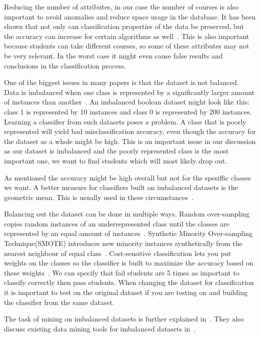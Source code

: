 \bigskip\noindent
Reducing the number of attributes, in our case the number of courses is also important to avoid anomalies and reduce space usage in the database.
It has been shown that not only can classification properties of the data be preserved, but the accuracy can increase for certain algorithms as well~\cite{9}.
This is also important because students can take different courses, so some of these attributes may not be very relevant. 
In the worst case it might even cause false results and conclusions in the classification process.

\bigskip\noindent
One of the biggest issues in many papers is that the dataset is not balanced. 
Data is imbalanced when one class is represented by a significantly larger amount of instances than another~\cite{10}. 
An imbalanced boolean dataset might look like this: class 1 is represented by 10 instances and class 0 is represented by 200 instances. 
Learning a classifier from such datasets poses a problem. 
A class that is poorly represented will yield bad misclassification accuracy, 
even though the accuracy for the dataset as a whole might be high. 
This is an important issue in our discussion as our dataset is imbalanced and the poorly represented class is the most important one, 
we want to find students which will most likely drop out.

\bigskip\noindent
As mentioned the accuracy might be high overall but not for the spesiffic classes we want.
A better measure for classifiers built on imbalanced datasets is the geometric mean. 
This is usually used in these circumstances~\cite{12}. 

\bigskip\noindent
Balancing out the dataset can be done in multiple ways. 
Random over-sampling copies random instances of an underrepresented class until the classes are represented by an equal amount of instances~\cite{12}. 
Synthetic Minority Over-sampling Technique(SMOTE) introduces new minority instances synthetically from the nearest neighbour of equal class~\cite{9}. 
Cost-sensitive classification lets you put weights on the classes so the classifier is built to maximize the accuracy based on these weights~\cite{9}. 
We can specify that fail students are 5 times as important to classify correctly then pass students. 
When changing the dataset for classification it is important to test on the original dataset if you are testing on and building the classifier from the same dataset.

\bigskip\noindent
The task of mining on imbalanced datasets is further explained in~\cite{10}.
They also discuss existing data mining tools for imbalanced datasets in~\cite{8}.

